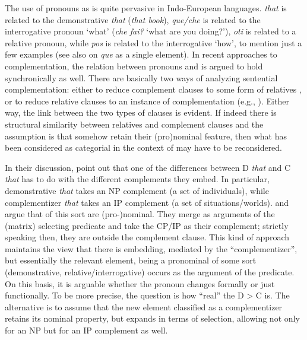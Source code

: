 \documentclass[output=paper]{langsci/langscibook}
\begin{document}
The use of pronouns as  is quite pervasive in Indo-European
languages.  \emph{that} is related to the demonstrative \emph{that}
(\emph{that book}),  \emph{que/che} is related to the interrogative
pronoun ‘what’ (\emph{che fai?} ‘what are you doing?’),  \emph{oti} is
related to a relative pronoun, while \emph{pos} is related to the interrogative
‘how’, to mention just a few examples (see also \citealt{Rooryck2013} on 
\emph{que} as a single element). In recent approaches to complementation, the
relation between pronouns and  is argued to hold synchronically
as well. There are basically two ways of analyzing sentential complementation:
either to reduce complement clauses to some form of relatives
\parencite[e.g.,][]{Arsenijevic2009,Kayne2010b,ManSav2011}, or to reduce
relative clauses to an instance of complementation (e.g., \citealt{Kayne1994}).
Either way, the link between the two types of clauses is evident. If indeed
there is structural similarity between relatives and complement clauses and the
assumption is that  somehow retain their (pro)nominal feature,
then what has been considered as categorial  in the context of
 may have to be reconsidered.

In their discussion, \citet{RobRou2003} point out that one of the differences
between D \emph{that} and C \emph{that} has to do with the different
complements they embed. In particular, demonstrative \emph{that} takes an NP
complement (a set of individuals), while complementizer \emph{that} takes an IP
complement (a set of situations/worlds).  \textcite{ManSav2007,ManSav2011} and
\citet{Roussou2010} argue that  of this sort are (pro-)nominal.
They merge as arguments of the (matrix) selecting predicate and take the CP/IP
as their complement; strictly speaking then, they are outside the complement
clause. This kind of approach maintains the view that there is embedding,
mediated by the \enquote{complementizer}, but essentially the relevant element, being a
pronominal of some sort (demonstrative, relative/interrogative) occurs as the
argument of the predicate. On this basis, it is arguable whether the pronoun
changes formally or just functionally. To be more precise, the question is how
\enquote{real} the D > C  is. The alternative is to assume that
the new element classified as a complementizer retains its
nominal property, but expands in terms of selection, allowing not only for an
NP but for an IP complement as well.
\end{document}

